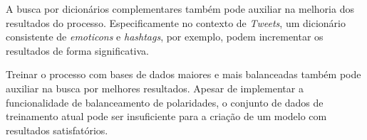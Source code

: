 \documentclass[12pt]{article}
\begin{document}
A busca por dicionários complementares também pode auxiliar na melhoria dos resultados do processo. Especificamente no contexto de \emph{Tweets}, um dicionário consistente de \emph{emoticons} e \emph{hashtags}, por exemplo, podem incrementar os resultados de forma significativa.

Treinar o processo com bases de dados maiores e mais balanceadas também pode auxiliar na busca por melhores resultados. Apesar de implementar a funcionalidade de balanceamento de polaridades, o conjunto de dados de treinamento atual pode ser insuficiente para a criação de um modelo com resultados satisfatórios.






\end{document}
